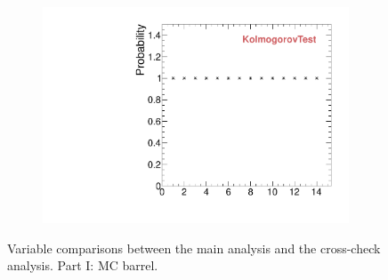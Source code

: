 \begin{figure}
\begin{subfigure}[b]{0.2\textwidth}
                \includegraphics[width=\textwidth]{Figures/VariablesComparison/MC_barrel_figs/KS}
                \label{fig:MC_barrel_KS}
        \end{subfigure}
        \caption{Variable comparisons between the main analysis and the cross-check analysis. Part I: MC barrel.}
        \label{fig:MC_barrel_figs}
\end{figure}


